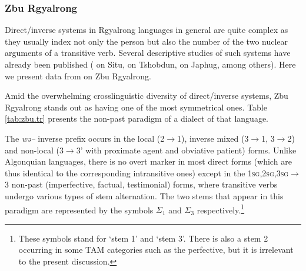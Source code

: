 \documentclass[twoside,a4paper,11pt]{article}
\newcommand{\ipa}[1]{{\phon\textit{#1}}}
\newcommand{\Σ}{\greek{Σ}}
\newcommand{\ra}{$\Sigma_1$}
\newcommand{\rc}{$\Sigma_3$}
\begin{document}
\subsubsection{Zbu Rgyalrong}

Direct/inverse systems in Rgyalrong languages in general are quite complex as they usually index not only the person but also the number of the two nuclear arguments of a transitive verb. Several descriptive studies of such systems have already been published (\citealt{delancey81direction} on Situ,  \citealt{jackson02rentongdengdi} on Tshobdun,  \citealt{jacques10inverse} on Japhug, among others). Here we present data from \citealt{gongxun14agreement} on Zbu Rgyalrong.

Amid the overwhelming crosslinguistic diversity of direct/inverse systems, Zbu Rgyalrong stands out as having one of the most symmetrical ones. Table \ref{tab:zbu.tr} presents the non-past paradigm of a dialect of that language.  


The \ipa{wə--} inverse prefix occurs in the local (2$\rightarrow$1), inverse mixed (3$\rightarrow$1, 3$\rightarrow$2) and non-local (3$\rightarrow$3' with proximate agent and obviative patient) forms. Unlike Algonquian languages, there is no overt marker in most direct forms (which are thus identical to the corresponding intransitive ones) except in the \textsc{1sg,2sg,3sg$\rightarrow$3}    non-past   (imperfective, factual, testimonial) forms, where transitive verbs undergo various types of stem alternation. The two stems that appear in this paradigm are represented by the symbols   \ra{} and \rc{} respectively.\footnote{These symbols stand for `stem 1' and `stem 3'. There is also a stem 2 occurring in some TAM categories such as the perfective, but it is irrelevant to the present discussion.}

 
\end{document}
